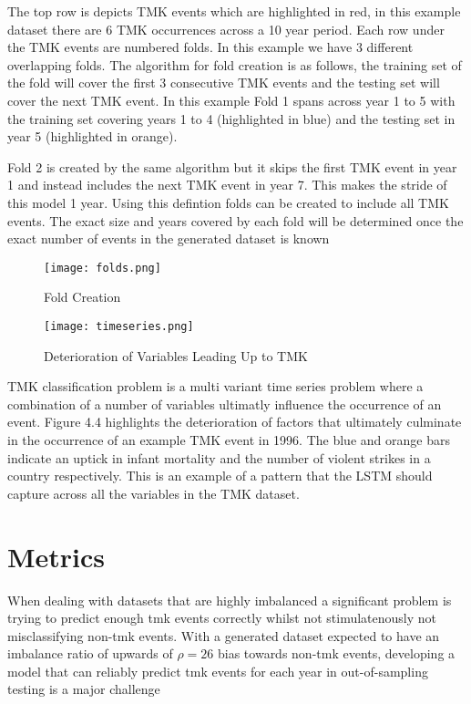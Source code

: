 The top row is depicts TMK events which are highlighted in red, in this example dataset there are 6 TMK occurrences across a 10 year period. Each row under the TMK events are numbered folds. In this example we have 3 different overlapping folds. The algorithm for fold creation is as follows, the training set of the fold will cover the first 3 consecutive TMK events and the testing set will cover the next TMK event. In this example Fold 1 spans across year 1 to 5 with the training set covering years 1 to 4 (highlighted in blue) and the testing set in year 5 (highlighted in orange).

Fold 2 is created by the same algorithm but it skips the first TMK event in year 1 and instead includes the next TMK event in year 7. This makes the stride of this model 1 year. Using this defintion folds can be created to include all TMK events. The exact size and years covered by each fold will be determined once the exact number of events in the generated dataset is known

\begin{figure}[h]
\centering
\texttt{[image: folds.png]}
\caption{Fold Creation}
\end{figure}


\begin{figure}[h]
\centering
\texttt{[image: timeseries.png]}
\caption{Deterioration of Variables Leading Up to TMK}
\end{figure}
\clearpage

TMK classification problem is a multi variant time series problem where a combination of a number of variables ultimatly influence the occurrence of an event. Figure 4.4 highlights the deterioration of factors that ultimately culminate in the occurrence of an example TMK event in 1996. The blue and orange bars indicate an uptick in infant mortality and the number of violent strikes in a country respectively. This is an example of a pattern that the LSTM should capture across all the variables in the TMK dataset. 


\section{Metrics}
When dealing with datasets that are highly imbalanced a significant problem is trying to predict enough tmk events correctly whilst not stimulatenously not misclassifying non-tmk events. With a generated dataset expected to have an imbalance ratio of upwards of $\rho = 26$ bias towards non-tmk events, developing a model that can reliably predict tmk events for each year in out-of-sampling testing is a major challenge

